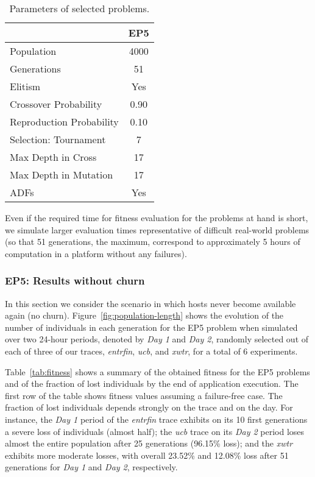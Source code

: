 \documentclass[graybox]{sty/svmult}
\begin{document}
\begin{table}
    \caption{Parameters of selected problems.}
    \begin{center}
\begin{tabular}{|l|c|}         
        \cline{2-2}
        \multicolumn{1}{c|}{} & EP5 \\
        \hline Population & 4000 \\
        \hline Generations & 51  \\
        \hline Elitism & Yes \\         
        \hline Crossover Probability & 0.90 \\         
        \hline Reproduction Probability & 0.10 \\
        \hline Selection: Tournament & 7 \\
        \hline Max Depth in Cross & 17 \\
        \hline Max Depth in Mutation & 17 \\
        \hline ADFs & Yes \\
        \hline     
    \end{tabular} 
\end{center}
\label{tab:gp-parameters} 
\end{table}

Even if the required time for fitness evaluation for
the problems at hand is short, we simulate larger evaluation times
representative of difficult real-world problems (so that 51 generations,
the maximum, correspond to approximately 5 hours of computation in a
platform without any failures).

\subsubsection{EP5: Results without churn}

In this section we consider the scenario in which hosts never become
available again (no churn). Figure~\ref{fig:population-length} shows the evolution
of the number of individuals in each generation for the EP5 problem when simulated over two 24-hour periods, denoted by \emph{Day
1} and \emph{Day 2}, randomly selected out of each of three of our traces, \emph{entrfin}, \emph{ucb}, and \emph{xwtr}, for
a total of 6 experiments.

Table~\ref{tab:fitness} shows a summary of the obtained fitness for the EP5 problems and of the fraction of lost individuals
by the end of application execution.  The first row of the table shows
fitness values assuming a failure-free case.  The fraction of lost
individuals depends strongly on the trace and on the day. For instance,
the \emph{Day 1} period of the \emph{entrfin} trace exhibits on its
10 first generations a severe loss of individuals (almost half); the
\emph{ucb} trace on its \emph{Day 2} period loses almost the entire
population after 25 generations (96.15\% loss); and the \emph{xwtr}
exhibits more moderate losses, with overall 23.52\% and 12.08\% loss
after 51 generations for \emph{Day 1} and \emph{Day 2}, respectively.
\end{document}
